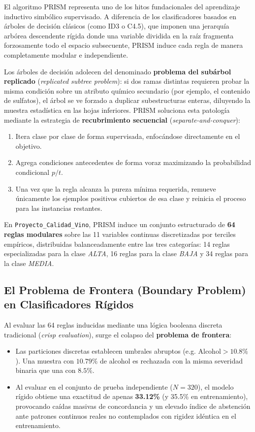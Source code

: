 \documentclass{article}
\begin{document}
El algoritmo PRISM \cite{cendrowska1987prism} representa uno de los hitos fundacionales del aprendizaje inductivo simbólico supervisado. A diferencia de los clasificadores basados en árboles de decisión clásicos (como ID3 o C4.5), que imponen una jerarquía arbórea descendente rígida donde una variable dividida en la raíz fragmenta forzosamente todo el espacio subsecuente, PRISM induce cada regla de manera completamente modular e independiente.

Los árboles de decisión adolecen del denominado \textbf{problema del subárbol replicado} (\textit{replicated subtree problem}): si dos ramas distintas requieren probar la misma condición sobre un atributo químico secundario (por ejemplo, el contenido de sulfatos), el árbol se ve forzado a duplicar subestructuras enteras, diluyendo la muestra estadística en las hojas inferiores. PRISM soluciona esta patología mediante la estrategia de \textbf{recubrimiento secuencial} (\textit{separate-and-conquer}):
\begin{enumerate}
    \item Itera clase por clase de forma supervisada, enfocándose directamente en el objetivo.
    \item Agrega condiciones antecedentes de forma voraz maximizando la probabilidad condicional $p/t$.
    \item Una vez que la regla alcanza la pureza mínima requerida, remueve únicamente los ejemplos positivos cubiertos de esa clase y reinicia el proceso para las instancias restantes.
\end{enumerate}

En \texttt{Proyecto\_Calidad\_Vino}, PRISM induce un conjunto estructurado de \textbf{64 reglas modulares} sobre las 11 variables continuas discretizadas por terciles empíricos, distribuidas balanceadamente entre las tres categorías: 14 reglas especializadas para la clase \textit{ALTA}, 16 reglas para la clase \textit{BAJA} y 34 reglas para la clase \textit{MEDIA}.

\subsection{El Problema de Frontera (Boundary Problem) en Clasificadores Rígidos}

Al evaluar las 64 reglas inducidas mediante una lógica booleana discreta tradicional (\textit{crisp evaluation}), surge el colapso del \textbf{problema de frontera}:
\begin{itemize}
    \item Las particiones discretas establecen umbrales abruptos (e.g. $\text{Alcohol} > 10.8\%$). Una muestra con $10.79\%$ de alcohol es rechazada con la misma severidad binaria que una con $8.5\%$.
    \item Al evaluar en el conjunto de prueba independiente ($N=320$), el modelo rígido obtiene una exactitud de apenas \textbf{33.12\%} (y 35.5\% en entrenamiento), provocando caídas masivas de concordancia y un elevado índice de abstención ante patrones continuos reales no contemplados con rigidez idéntica en el entrenamiento.
\end{itemize}
\end{document}
